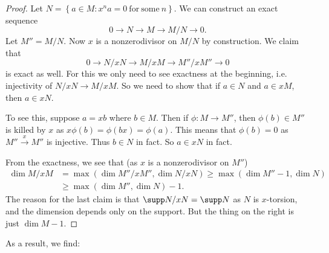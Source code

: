 \begin{proof} 
Let $N = \left\{a \in M: x^n a = 0 \ \mathrm{for \ some \ } n \right\}$. We can
construct an exact sequence
\[ 0 \to N \to M \to M/N \to 0.  \]
Let $M'' = M/N$.
Now $x$ is a nonzerodivisor on $M/N$ by construction. We claim that 
\[ 0 \to N/xN \to M/xM \to M''/xM'' \to 0  \]
is exact as well. For this we only need to see exactness at the beginning,
i.e. injectivity of $N/xN \to M/xM$. So
we need to show that if $a \in N$ and $a \in xM$, then $a \in x N$.

To see this, suppose $a = xb$ where $b \in M$. Then if $\phi: M \to M''$, then
$\phi(b) \in M''$ is killed by $x$ as $x \phi(b) = \phi(bx) = \phi(a)$.
This means that $\phi(b)=0$ as $M'' \stackrel{x}{\to} M''$ is injective. Thus
$b \in N$ in fact. So $a \in xN$ in fact.

From the exactness, we see that (as $x$ is a nonzerodivisor on $M''$)
\begin{align*} \dim M/xM & = \max (\dim M''/xM'', \dim N/xN) \geq \max(\dim M'' -1, \dim
N)\\ &  \geq \max( \dim M'', \dim N)-1  .  \end{align*}
The reason for the last claim is that $\supp N/xN = \supp N$ as $N$ is
$x$-torsion, and the dimension depends only on the support. But the thing on the right is just $\dim M -1$. 
\end{proof} 

As a result, we find:

